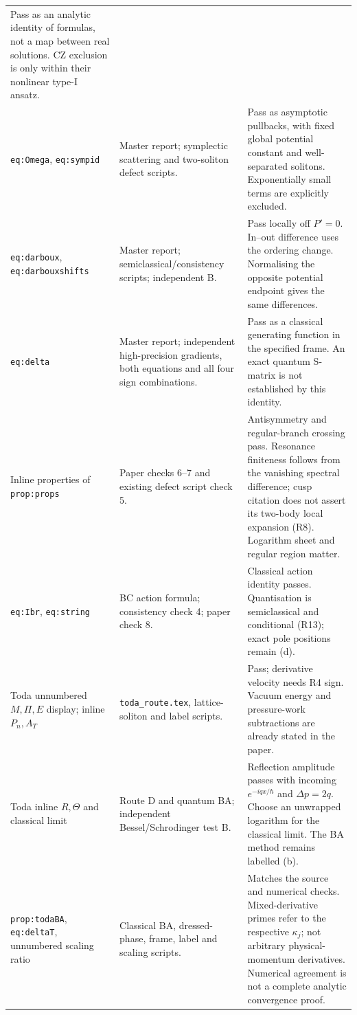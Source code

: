 \documentclass[11pt,a4paper]{article}
\newcommand{\file}[1]{\nolinkurl{#1}}
\begin{document}
\begin{longtable}{@{}L{5.1cm}L{4.9cm}L{5.6cm}@{}}
Pass as an analytic identity of formulas, not a map between real solutions.
CZ exclusion is only within their nonlinear type-I ansatz.\\
\file{eq:Omega}, \file{eq:sympid} &
Master report; symplectic scattering and two-soliton defect scripts. &
Pass as asymptotic pullbacks, with fixed global potential constant and
well-separated solitons. Exponentially small terms are explicitly excluded.\\
\file{eq:darboux}, \file{eq:darbouxshifts} &
Master report; semiclassical/consistency scripts; independent B. &
Pass locally off $P'=0$. In--out difference uses the ordering change.
Normalising the opposite potential endpoint gives the same differences.\\
\file{eq:delta} &
Master report; independent high-precision gradients, both equations and
all four sign combinations. &
Pass as a classical generating function in the specified frame.
An exact quantum S-matrix is not established by this identity.\\
Inline properties of \file{prop:props} &
Paper checks 6--7 and existing defect script check 5. &
Antisymmetry and regular-branch crossing pass. Resonance finiteness follows
from the vanishing spectral difference; cusp citation does not assert its
two-body local expansion (R8). Logarithm sheet and regular region matter.\\
\file{eq:Ibr}, \file{eq:string} &
BC action formula; consistency check 4; paper check 8. &
Classical action identity passes. Quantisation is semiclassical and
conditional (R13); exact pole positions remain (d).\\
Toda unnumbered $M,\Pi,E$ display; inline $P_n,A_T$ &
\file{toda_route.tex}, lattice-soliton and label scripts. &
Pass; derivative velocity needs R4 sign. Vacuum energy and pressure-work
subtractions are already stated in the paper.\\
Toda inline $R,\Theta$ and classical limit &
Route D and quantum BA; independent Bessel/Schrodinger test B. &
Reflection amplitude passes with incoming $e^{-iqx/\hbar}$ and
$\Delta p=2q$. Choose an unwrapped logarithm for the classical limit.
The BA method remains labelled (b).\\
\file{prop:todaBA}, \file{eq:deltaT}, unnumbered scaling ratio &
Classical BA, dressed-phase, frame, label and scaling scripts. &
Matches the source and numerical checks. Mixed-derivative primes refer
to the respective $\kappa_j$; not arbitrary physical-momentum derivatives.
Numerical agreement is not a complete analytic convergence proof.\\

\end{longtable}
\end{document}
